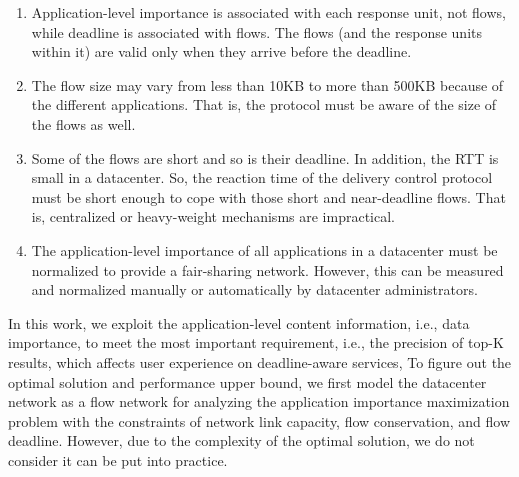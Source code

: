 \documentclass[conference]{IEEEtran}
\begin{document}
\begin{enumerate}
\item Application-level importance is associated with each response unit, not flows, while deadline is associated with flows. The flows (and the response units within it) are valid only when they arrive before the deadline.
\item The flow size may vary from less than 10KB to more than 500KB because of the different applications. That is, the protocol must be aware of the size of the flows as well.
\item Some of the flows are short and so is their deadline. In addition, the RTT is small in a datacenter. So, the reaction time of the delivery control protocol must be short enough to cope with those short and near-deadline flows. That is, centralized or heavy-weight mechanisms are impractical.
\item The application-level importance of all applications in a datacenter must be normalized to provide a fair-sharing network. However, this can be measured and normalized manually or automatically by datacenter administrators.
\end{enumerate}

In this work, we exploit the application-level content information, i.e., data importance, to meet the most important requirement, i.e., the precision of top-K results, which affects user experience on deadline-aware services, To figure out the optimal solution and performance upper bound, we first model the datacenter network as a flow network for analyzing the application importance maximization problem with the constraints of network link capacity, flow conservation, and flow deadline.
However, due to the complexity of the optimal solution, we do not consider it can be put into practice.
\end{document}
